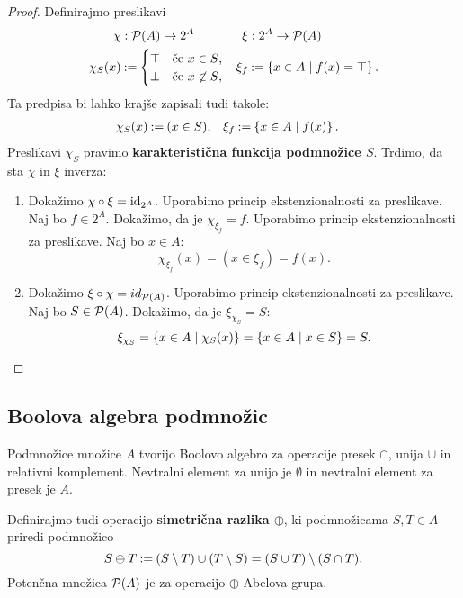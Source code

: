 \begin{proof}
  Definirajmo preslikavi
  \begin{align*}
    \chi &: \pow{A} \to 2^A &
    \xi &: 2^A \to \pow{A} \\
    \chi_S(x) &\defeq
      \begin{cases}
        \top & \text{če $x \in S$,} \\
        \bot & \text{če $x \not\in S$,}
      \end{cases}
    &
    \xi_f &\defeq \set{x \in A \such f(x) = \top}.
  \end{align*}
  Ta predpisa bi lahko krajše zapisali tudi takole:
  \begin{align*}
  \chi_S(x) &\defeq (x \in S), &
  \xi_f &\defeq \set{x \in A \such f(x) }.
  \end{align*}
  Preslikavi $\chi_S$ pravimo \textbf{karakteristična funkcija podmnožice $S$}.
  Trdimo, da sta $\chi$ in $\xi$ inverza:
  \begin{enumerate}
  \item 
    Dokažimo $\chi \circ \xi = \id[2^A]$. Uporabimo princip ekstenzionalnosti za preslikave.
    Naj bo $f \in 2^A$. Dokažimo, da je $\chi_{\xi_f} = f$.
    Uporabimo princip ekstenzionalnosti za preslikave. Naj bo $x \in A$:
    \begin{equation*}
      \chi_{\xi_f}(x) = (x \in \xi_f) = f(x).
    \end{equation*}

  \item
    Dokažimo $\xi \circ \chi = id_{\pow{A}}$. Uporabimo princip ekstenzionalnosti za preslikave. Naj bo $S \in \pow{A}$. Dokažimo, da je $\xi_{\chi_S} = S$:
    \begin{equation*}
      \xi_{\chi_S} = \set{x \in A \such \chi_S(x)} = \set{x \in A \such x \in S} = S.
    \end{equation*}
  \end{enumerate}
\end{proof}

\subsection{Boolova algebra podmnožic}

Podmnožice množice $A$ tvorijo Boolovo algebro za operacije presek $\cap$, unija $\cup$ in relativni komplement. Nevtralni element za unijo je $\emptyset$ in nevtralni element za presek je $A$.

Definirajmo tudi operacijo \textbf{simetrična razlika $\oplus$}, ki podmnožicama $S, T \in A$ priredi podmnožico
%
\begin{equation*}
  S \oplus T \defeq (S \setminus T) \cup (T \setminus S) = (S \cup T) \setminus (S \cap T).
\end{equation*}
%
Potenčna množica $\pow{A}$ je za operacijo $\oplus$ Abelova grupa.
